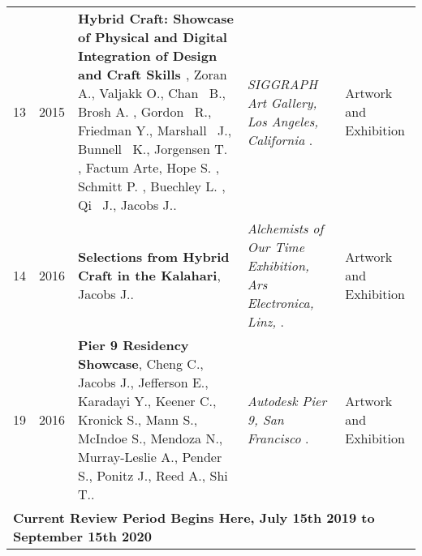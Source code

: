 \begin{longtable}{lcp{7.75cm}>{\raggedright}p{5.25cm}p{1.75cm}}
    13 & 2015 & {\bf Hybrid Craft: Showcase of Physical and Digital Integration of Design and Craft Skills }, Zoran A., Valjakk O., Chan  B., Brosh A. , Gordon  R., Friedman Y., Marshall  J., Bunnell  K., Jorgensen T. , Factum Arte, Hope S. , Schmitt P. , Buechley L. , Qi  J., Jacobs J.. & \emph{ SIGGRAPH Art Gallery, Los Angeles, California  }.  & Artwork and Exhibition\\
    14 & 2016 & {\bf Selections from Hybrid Craft in the Kalahari}, Jacobs J.. & \emph{ Alchemists of Our Time Exhibition, Ars Electronica, Linz,  }.  & Artwork and Exhibition\\
    19 & 2016 & {\bf Pier 9 Residency Showcase}, Cheng C., Jacobs J., Jefferson E., Karadayi Y., Keener C., Kronick S., Mann S., McIndoe S., Mendoza N., Murray-Leslie A., Pender S., Ponitz J., Reed A., Shi T.. & \emph{ Autodesk Pier 9, San Francisco }.  & Artwork and Exhibition\\

\hline
 \multicolumn{5}{l}{\bf \cellcolor{yellow!25}Current Review Period Begins Here, July 15th 2019 to September 15th 2020}\\
   \hline  
\end{longtable}
